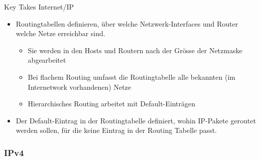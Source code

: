 \begin{KR}{Key Takes Internet/IP}
\begin{itemize}
\begin{itemize}
        \end{itemize}
        \item Routingtabellen definieren, über welche Netzwerk-Interfaces und Router welche Netze erreichbar sind.
        \begin{itemize}
            \item Sie werden in den Hosts und Routern nach der Grösse der Netzmaske abgearbeitet
            \item Bei flachem Routing umfasst die Routingtabelle alle bekannten (im Internetwork vorhandenen) Netze
            \item Hierarchisches Routing arbeitet mit Default-Einträgen
        \end{itemize}
        \item Der Default-Eintrag in der Routingtabelle definiert, wohin IP-Pakete geroutet werden sollen, für die keine Eintrag in der Routing Tabelle passt.
    \end{itemize}
\end{KR}

\subsubsection{IPv4}

